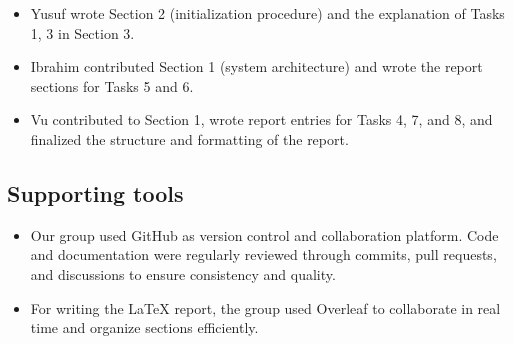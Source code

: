 \documentclass[a4paper, 12pt]{article}
\begin{document}
\begin{itemize}
    \item Yusuf wrote Section 2 (initialization procedure) and the explanation of Tasks 1, 3 in Section 3.
    \item Ibrahim contributed Section 1 (system architecture) and wrote the report sections for Tasks 5 and 6.
    \item Vu contributed to Section 1, wrote report entries for Tasks 4, 7, and 8, and finalized the structure and formatting of the report.
\end{itemize}

\subsection{Supporting tools}

\begin{itemize}
    \item Our group used GitHub as version control and collaboration platform. Code and documentation were regularly reviewed through commits, pull requests, and discussions to ensure consistency and quality.
    \item For writing the LaTeX report, the group used Overleaf to collaborate in real time and organize sections efficiently.
\end{itemize}
\end{document}
